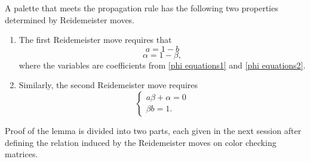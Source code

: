     \begin{lemma}\label{warunki na palete}
  A palette that meets the propagation rule has the following two properties determined by Reidemeister moves.
  \begin{enumerate}
    \item The first Reidemeister move requires that
      $$a=1-b$$
      $$\alpha=1-\beta,$$
      where the variables are coefficients from \eqref{phi equations1} and \eqref{phi equations2}.  
    \item Similarly, the second Reidemeister move requires
      $$\begin{cases}
        a\beta+\alpha=0\\ 
        \beta b=1.
      \end{cases}$$
  \end{enumerate}
\end{lemma}

Proof of the lemma is divided into two parts, each given in the next session after defining the relation induced by the Reidemeister moves on color checking matrices.
